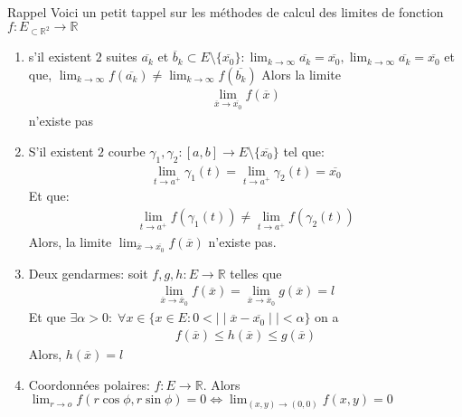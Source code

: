 \begin{parag}{Rappel}
    Voici un petit tappel sur les méthodes de calcul des limites de fonction $f: E_{ \subset \mathbb{R}^2} \to \mathbb{R}$
    \begin{enumerate}
        \item s'il existent $2$ suites $ \overline{a_k}$ et $ \overline{b}_k \subset E \setminus\{ \overline{x_0}\}: \lim_{ k \to \infty} \overline{a_k} = \overline{x_0}, \lim_{k \to \infty} \overline{a_k} = \overline{x_0}$ et que, $\lim_{k \to \infty}f( \overline{a_k}) \neq \lim_{k \to \infty} f( \overline{b_k})$ Alors la limite
            \begin{align*}
                \lim_{ \overline{x} \to \overline{x_0}} f( \overline{x})
            \end{align*}
            n'existe pas
        \item S'il existent $2$ courbe $ \gamma_1, \gamma_2: [a, b] \to E \setminus \{ \overline{x_0}\}$ tel que:
            \begin{align*}
                \lim_{t \to a^+} \gamma_1(t) = \lim_{ t \to a^+} \gamma_2(t) = \overline{x_0}
            \end{align*}
            Et que:
            \begin{align*}
               \lim_{t \to a^+}f( \gamma_1(t)) \neq \lim_{t \to a^+} f( \gamma_2(t))
            \end{align*}
            Alors, la limite $ \lim_{ \overline{x} \to \overline{x_0}}f( \overline{x})$ n'existe pas. 
        \item Deux gendarmes: soit $f, g, h: E \to \mathbb{R}$ telles que 
            \begin{align*}
                    \lim_{ \overline{x} \to \overline{x}_0} f( \overline{x}) = \lim_{ \overline{x} \to \overline{x}_0} g( \overline{x})= l
            \end{align*}
            Et que $ \exists \alpha > 0:\; \forall x \in \{x \in E: 0 < \mid \mid \overline{x}- \overline{x_0} \mid \mid < \alpha\}$ on a
            \begin{align*}
                f( \overline{x}) \leq h( \overline{x}) \leq g( \overline{x})
            \end{align*}
            Alors, $h( \overline{x}) = l$
        \item Coordonnées polaires: $f: E \to \mathbb{R}$. Alors $ \lim_{r \to o} f( r\cos\phi, r\sin\phi) = 0 \iff \lim_{(x, y) \to (0, 0)} f(x, y) = 0$ 

\end{enumerate}
\end{parag}

